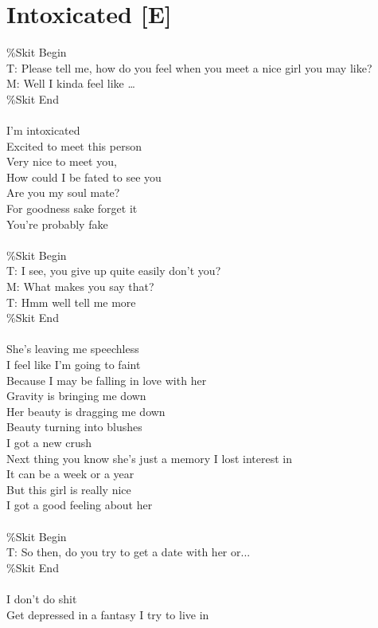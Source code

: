 \documentclass[12pt, b5paper, oneside]{book}
\begin{document}
\section{Intoxicated [E]}
\%Skit Begin
\\T: Please tell me, how do you feel when you meet a nice girl you may like?
\\M: Well I kinda feel like  \dots 
\\\%Skit End
%
\\\\I'm intoxicated
\\Excited to meet this person
\\Very nice to meet you,
\\How could I be fated to see you
\\Are you my soul mate?
\\For goodness sake forget it
\\You're probably fake
%
\\\\\%Skit Begin
\\T: I see, you give up quite easily don't you?
\\M: What makes you say that?
\\T: Hmm well tell me more
\\\%Skit End
%
\\\\She's leaving me speechless
\\I feel like I'm going to faint
\\Because I may be falling in love with her
\\Gravity is bringing me down
\\Her beauty is dragging me down
\\Beauty turning into blushes
\\I got a new crush
\\Next thing you know she's just a memory I lost interest in
\\It can be a week or a year
\\But this girl is really nice
\\I got a good feeling about her
%
\\\\\%Skit Begin
\\T: So then, do you try to get a date with her or...
\\\%Skit End
%
\\\\I don't do shit
\\Get depressed in a fantasy I try to live in
\end{document}
